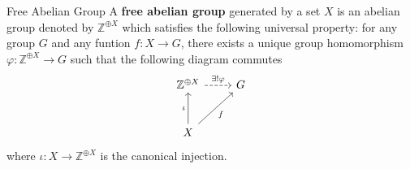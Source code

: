 \begin{definition}{Free Abelian Group}{}
    A \textbf{free abelian group} generated by a set $X$ is an abelian group denoted by $\mathbb{Z}^{\oplus X}$ which satisfies the following universal property: for any group $G$ and any funtion $f:X\to G$, there exists a unique group homomorphism $\varphi:\mathbb{Z}^{\oplus X}\to G$ such that the following diagram commutes
    \[
        \begin{tikzcd}[ampersand replacement=\&]
            \mathbb{Z}^{\oplus X} \arrow[r, "\exists!\varphi", dashed] \& G \\[+10pt]
            X \arrow[u, "\iota"] \arrow[ru, "f"']                      \&
        \end{tikzcd}
    \]
    where $\iota:X\to \mathbb{Z}^{\oplus X}$ is the canonical injection.

\end{definition}






